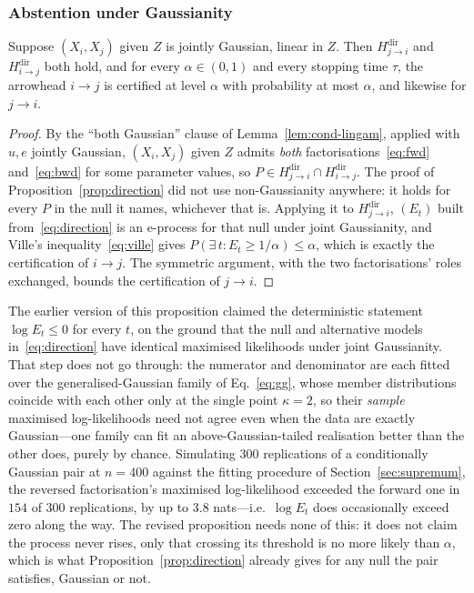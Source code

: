 \subsubsection{Abstention under Gaussianity}\label{sec:abstention}

\begin{proposition}\label{prop:abstain}
Suppose $(X_i, X_j)$ given $Z$ is jointly Gaussian, linear in $Z$. Then
$H^{\mathrm{dir}}_{j \to i}$ and $H^{\mathrm{dir}}_{i \to j}$ both hold, and
for every $\alpha \in (0,1)$ and every stopping time $\tau$, the arrowhead
$i \to j$ is certified at level $\alpha$ with probability at most $\alpha$,
and likewise for $j \to i$.
\end{proposition}

\begin{proof}
By the ``both Gaussian'' clause of Lemma~\ref{lem:cond-lingam}, applied with
$u, e$ jointly Gaussian, $(X_i, X_j)$ given $Z$ admits \emph{both}
factorisations~\eqref{eq:fwd} and~\eqref{eq:bwd} for some parameter values, so
$P \in H^{\mathrm{dir}}_{j \to i} \cap H^{\mathrm{dir}}_{i \to j}$. The proof
of Proposition~\ref{prop:direction} did not use non-Gaussianity anywhere: it
holds for every $P$ in the null it names, whichever that is. Applying it to
$H^{\mathrm{dir}}_{j \to i}$, $(E_t)$ built from~\eqref{eq:direction} is an
e-process for that null under joint Gaussianity, and Ville's
inequality~\eqref{eq:ville} gives $P(\exists\, t : E_t \ge 1/\alpha) \le \alpha$,
which is exactly the certification of $i \to j$. The symmetric argument, with
the two factorisations' roles exchanged, bounds the certification of
$j \to i$.
\end{proof}

The earlier version of this proposition claimed the deterministic statement
$\log E_t \le 0$ for every $t$, on the ground that the null and alternative
models in~\eqref{eq:direction} have identical maximised likelihoods under joint
Gaussianity. That step does not go through: the numerator and denominator are
each fitted over the generalised-Gaussian family of Eq.~\eqref{eq:gg}, whose
member distributions coincide with each other only at the single point
$\kappa = 2$, so their \emph{sample} maximised log-likelihoods need not agree
even when the data are exactly Gaussian---one family can fit an
above-Gaussian-tailed realisation better than the other does, purely by
chance. Simulating $300$ replications of a conditionally Gaussian pair at
$n = 400$ against the fitting procedure of Section~\ref{sec:supremum}, the
reversed factorisation's maximised log-likelihood exceeded the forward one in
$154$ of $300$ replications, by up to $3.8$ nats---i.e.\ $\log E_t$ does
occasionally exceed zero along the way. The revised proposition needs none of
this: it does not claim the process never rises, only that crossing its
threshold is no more likely than $\alpha$, which is what
Proposition~\ref{prop:direction} already gives for any null the pair
satisfies, Gaussian or not.

